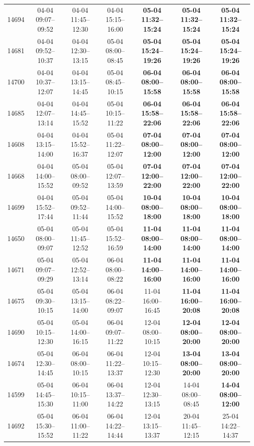 \begin{table}[htbp]
\begin{tabular}{|r|c|c|c|c|c|c|}
14694 & 04-04 09:07--09:52 & 04-04 11:45--12:30 & 04-04 15:15--16:00 & \textbf{05-04 11:32--15:24} & \textbf{05-04 11:32--15:24} & \textbf{05-04 11:32--15:24} \\ 
14681 & 04-04 09:52--10:37 & 04-04 12:30--13:15 & 05-04 08:00--08:45 & \textbf{05-04 15:24--19:26} & \textbf{05-04 15:24--19:26} & \textbf{05-04 15:24--19:26} \\ 
14700 & 04-04 10:37--12:07 & 04-04 13:15--14:45 & 05-04 08:45--10:15 & \textbf{06-04 08:00--15:58} & \textbf{06-04 08:00--15:58} & \textbf{06-04 08:00--15:58} \\ 
14685 & 04-04 12:07--13:14 & 04-04 14:45--15:52 & 05-04 10:15--11:22 & \textbf{06-04 15:58--22:06} & \textbf{06-04 15:58--22:06} & \textbf{06-04 15:58--22:06} \\ 
14608 & 04-04 13:15--14:00 & 04-04 15:52--16:37 & 05-04 11:22--12:07 & \textbf{07-04 08:00--12:00} & \textbf{07-04 08:00--12:00} & \textbf{07-04 08:00--12:00} \\ 
14668 & 04-04 14:00--15:52 & 05-04 08:00--09:52 & 05-04 12:07--13:59 & \textbf{07-04 12:00--22:00} & \textbf{07-04 12:00--22:00} & \textbf{07-04 12:00--22:00} \\ 
14699 & 04-04 15:52--17:44 & 05-04 09:52--11:44 & 05-04 14:00--15:52 & \textbf{10-04 08:00--18:00} & \textbf{10-04 08:00--18:00} & \textbf{10-04 08:00--18:00} \\ 
14650 & 05-04 08:00--09:07 & 05-04 11:45--12:52 & 05-04 15:52--16:59 & \textbf{11-04 08:00--14:00} & \textbf{11-04 08:00--14:00} & \textbf{11-04 08:00--14:00} \\ 
14671 & 05-04 09:07--09:29 & 05-04 12:52--13:14 & 06-04 08:00--08:22 & \textbf{11-04 14:00--16:00} & \textbf{11-04 14:00--16:00} & \textbf{11-04 14:00--16:00} \\ 
14675 & 05-04 09:30--10:15 & 05-04 13:15--14:00 & 06-04 08:22--09:07 & 11-04 16:00--16:45 & \textbf{11-04 16:00--20:08} & \textbf{11-04 16:00--20:08} \\ 
14690 & 05-04 10:15--12:30 & 05-04 14:00--16:15 & 06-04 09:07--11:22 & 12-04 08:00--10:15 & \textbf{12-04 08:00--20:00} & \textbf{12-04 08:00--20:00} \\ 
14674 & 05-04 12:30--14:45 & 06-04 08:00--10:15 & 06-04 11:22--13:37 & 12-04 10:15--12:30 & \textbf{13-04 08:00--20:00} & \textbf{13-04 08:00--20:00} \\ 
14599 & 05-04 14:45--15:30 & 06-04 10:15--11:00 & 06-04 13:37--14:22 & 12-04 12:30--13:15 & 14-04 08:00--08:45 & \textbf{14-04 08:00--12:00} \\ 
14692 & 05-04 15:30--15:52 & 06-04 11:00--11:22 & 06-04 14:22--14:44 & 12-04 13:15--13:37 & 20-04 11:45--12:15 & 25-04 14:22--14:37 \\ 

\end{tabular}
\end{table}
